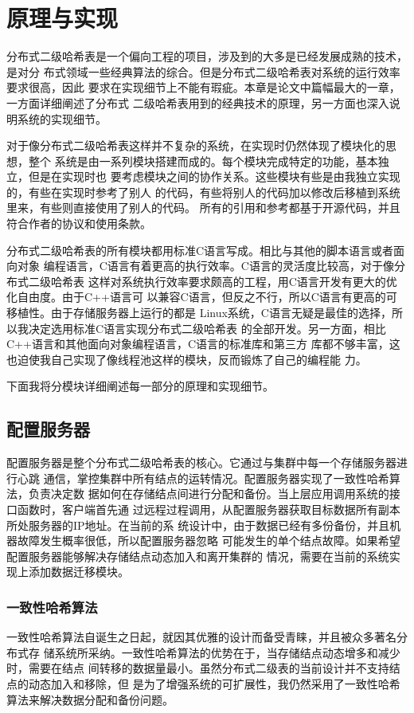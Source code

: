 \chapter{原理与实现}\label{chapter:implementation}
分布式二级哈希表是一个偏向工程的项目，涉及到的大多是已经发展成熟的技术，是对分
布式领域一些经典算法的综合。但是分布式二级哈希表对系统的运行效率要求很高，因此
要求在实现细节上不能有瑕疵。本章是论文中篇幅最大的一章，一方面详细阐述了分布式
二级哈希表用到的经典技术的原理，另一方面也深入说明系统的实现细节。

对于像分布式二级哈希表这样并不复杂的系统，在实现时仍然体现了模块化的思想，整个
系统是由一系列模块搭建而成的。每个模块完成特定的功能，基本独立，但是在实现时也
要考虑模块之间的协作关系。这些模块有些是由我独立实现的，有些在实现时参考了别人
的代码，有些将别人的代码加以修改后移植到系统里来，有些则直接使用了别人的代码。
所有的引用和参考都基于开源代码，并且符合作者的协议和使用条款。

分布式二级哈希表的所有模块都用标准C语言写成。相比与其他的脚本语言或者面向对象
编程语言，C语言有着更高的执行效率。C语言的灵活度比较高，对于像分布式二级哈希表
这样对系统执行效率要求颇高的工程，用C语言开发有更大的优化自由度。由于C++语言可
以兼容C语言，但反之不行，所以C语言有更高的可移植性。由于存储服务器上运行的都是
Linux系统，C语言无疑是最佳的选择，所以我决定选用标准C语言实现分布式二级哈希表
的全部开发。另一方面，相比C++语言和其他面向对象编程语言，C语言的标准库和第三方
库都不够丰富，这也迫使我自己实现了像线程池这样的模块，反而锻炼了自己的编程能
力。

下面我将分模块详细阐述每一部分的原理和实现细节。

\section{配置服务器}
配置服务器是整个分布式二级哈希表的核心。它通过与集群中每一个存储服务器进行心跳
通信，掌控集群中所有结点的运转情况。配置服务器实现了一致性哈希算法，负责决定数
据如何在存储结点间进行分配和备份。当上层应用调用系统的接口函数时，客户端首先通
过远程过程调用，从配置服务器获取目标数据所有副本所处服务器的IP地址。在当前的系
统设计中，由于数据已经有多份备份，并且机器故障发生概率很低，所以配置服务器忽略
可能发生的单个结点故障。如果希望配置服务器能够解决存储结点动态加入和离开集群的
情况，需要在当前的系统实现上添加数据迁移模块。

\subsection{一致性哈希算法}\label{subsection:consistent}
一致性哈希算法自诞生之日起，就因其优雅的设计而备受青睐，并且被众多著名分布式存
储系统所采纳。一致性哈希算法的优势在于，当存储结点动态增多和减少时，需要在结点
间转移的数据量最小。虽然分布式二级表的当前设计并不支持结点的动态加入和移除，但
是为了增强系统的可扩展性，我仍然采用了一致性哈希算法来解决数据分配和备份问题。

